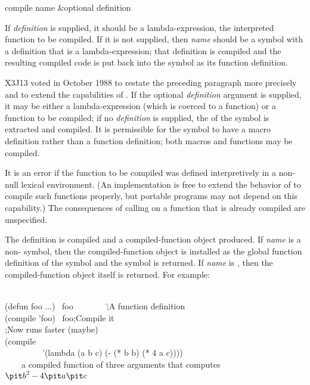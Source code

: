 \begin{defun}[Function]
compile name &optional definition

\begin{obsolete}\noindent
If {\it definition} is supplied, it should be a lambda-expression,
the interpreted function to be compiled.  If it is not supplied,
then {\it name} should be a symbol with a definition that is a
lambda-expression; that definition is compiled
and the resulting compiled code is put back into the symbol
as its function definition.
\end{obsolete}

\begin{newer}
X3J13 voted in October 1988 
to restate the preceding paragraph more precisely and to extend the
capabilities of .
If the optional {\it definition} argument is supplied,
it may be either a lambda-expression (which is coerced to a function)
or a function to be compiled; if no {\it definition} is supplied,
the  of the symbol is extracted and compiled.
It is permissible for the symbol to have a macro definition rather than
a function definition; both macros and functions may be compiled.

It is an error if the function to be compiled was defined interpretively
in a non-null lexical environment.  (An implementation is free to extend
the behavior of  to compile such functions properly, but
portable programs may not depend on this capability.)  The consequences
of calling  on a function that is already compiled
are unspecified.
\end{newer}

\begin{obsolete}
The definition is compiled and a compiled-function object produced.
If {\it name} is a non-{\nil}
symbol, then the compiled-function object is installed as the
global function definition of the symbol and the symbol is returned.
If {\it name} is {\false}, then the compiled-function object itself is returned.
For example:
\begin{lisp}
\\
(defun foo ...) \EV\ foo~~~~~~~~\=;{\rm A function definition} \\
(compile 'foo) \EV\ foo\>;{\rm Compile it} \\
\>;{\rm Now  runs faster (maybe)} \\[4pt]
(compile {\false} \\
~~~~~~~~~'(lambda (a b c) (- (* b b) (* 4 a c)))) \\
~~~\EV\ {\rm a compiled function of three arguments that computes ${\it b}^2-4{\it a}{\it c}$}
\end{lisp}
\end{obsolete}


\end{defun}
